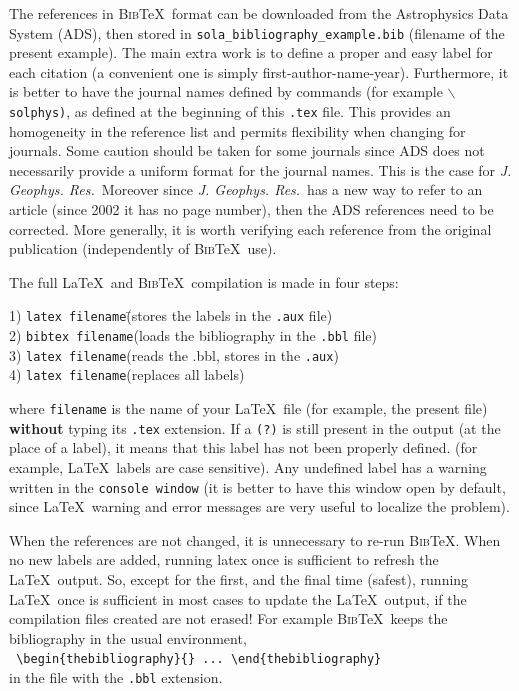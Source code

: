 \documentclass[namedreferences,hyperref,optionalrh]{spr-sola}
\newcommand{\BibTeX}{\textsc{Bib}\TeX}
\newcommand{\jgr}{{\it J. Geophys. Res.}}
\begin{document}
  The references in \BibTeX\ format can be downloaded from the 
Astrophysics Data System (ADS), then stored
in \verb+sola_bibliography_example.bib+ (file\linebreak name of the present example).
The main extra work is to define a proper and easy label for each citation
(a convenient one is simply first-author-name-year).  Furthermore, it is better
to have the journal names defined by commands (for example 
\texttt{$\backslash$solphys)}, as defined at the beginning of 
this \texttt{.tex} file.
This provides an homogeneity in the reference list and permits flexibility
when changing for journals.   Some caution should be taken for some journals
since ADS does not necessarily provide a uniform format for the
journal names. This is the case for \jgr\  Moreover since
\jgr\ has a new way to refer to an article 
(since 2002 it has no page number), then the ADS references need to be corrected. 
More generally, it is worth verifying
each reference from the original publication (independently of \BibTeX\ use).

   The full \LaTeX\ and \BibTeX\ compilation is made in four steps: 
\begin{tabbing}
1) {\tt latex filename}\qquad\qquad\=(stores the labels in the {\tt .aux} file)\\
2) {\tt bibtex filename}\>(loads the bibliography in the {\tt .bbl} file)\\
3) {\tt latex filename}\>(reads the .bbl, stores in the {\tt .aux})\\
4) {\tt latex filename}\>(replaces all labels)  
\end{tabbing}
   where \texttt{filename} is the name of your \LaTeX\ file (for example, 
the present file) {\bf without} typing its \texttt{.tex} extension.
If a \texttt{(?)} is still present in the output (at the place of a label),
it means that this label has not been properly defined. 
 (for example, \LaTeX\ labels are case sensitive).
Any undefined label has a warning written in the \texttt{console window}
(it is better to have this window open by default, since \LaTeX\ warning and 
error messages are very useful to localize the problem).

  When the references are not changed, it is unnecessary to re-run \BibTeX .
When no new labels are added, running latex once is sufficient to refresh
the \LaTeX\ output. So, except for
the first, and the final time (safest), running \LaTeX\ once is sufficient
in most cases to update the \LaTeX\ output, if the compilation files 
created are not erased! For example \BibTeX\ keeps the bibliography in the usual 
environment,\\
  \verb+ \begin{thebibliography}{} ... \end{thebibliography}+\\
in the file with the \verb+.bbl+ extension.  
\end{document}
